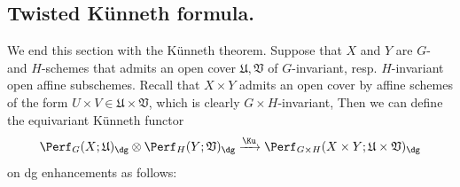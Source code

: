 \subsection{Twisted Künneth formula.}
We end this section with the K\"unneth theorem. Suppose that $X$ and $Y$ are $G$- and $H$-schemes that admits an open cover $\mathfrak{U},\mathfrak{V}$ of $G$-invariant, resp. $H$-invariant open affine subschemes. Recall that $X\times Y$ admits an open cover by affine schemes of the form $U\times V\in\mathfrak{U}\times\mathfrak{V}$, which is clearly $G\times H$-invariant, 
Then we can define the equivariant K\"unneth functor
$$
\Perf_G(X;\mathfrak{U})_{\dg}
\otimes
\Perf_H(Y;\mathfrak{V})_{\dg}
\xrightarrow{\Ku}
\Perf_{G\times H}(X\times Y;\mathfrak{U}\times\mathfrak{V})_{\dg}
$$
on dg enhancements as follows:
